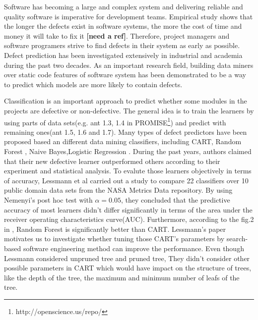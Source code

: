 \documentclass{acm_proc_article-sp}
\begin{document}
Software has becoming a large and complex system and delivering reliable and quality 
software is imperative for development teams. Empirical study shows that the longer the 
defects exist in software systems, the more the cost of time and money it will take to fix it 
\textbf{ [need a ref]}. Therefore, project managers and software programers strive to find 
defects in their system as early as possible. Defect prediction has been investigated 
extensively in industrial and academia during the past two decades. As an important research 
field, building data miners  \cite{lessmann2008benchmarking, mccabe1976complexity, 
menzies2007data, menzies2010defect, jiang2008can, menzies2011local, song2011general} 
over static code features of software system has been demonstrated to be a way to predict 
which models are more likely to contain defects.

Classification is an important approach to predict whether some modules in the projects are 
defective or non-defective. The general idea is to train the learners by using parts of data 
sets(e.g. ant 1.3, 1.4 in PROMISE\footnote{http://openscience.us/repo/}) and predict with 
remaining ones(ant 1.5, 1.6 and 1.7). Many types of defect predictors have been proposed 
based an different data mining classifiers, including CART, Random Forest 
\cite{guo2004robust},  Naive Bayes\cite{menzies2007data},Logistic Regression 
\cite{khoshgoftaar1999logistic}. During the past years, authors claimed that their new 
defective learner outperformed others according to their experiment and statistical analysis. 
To evalute those learners objectively in terms of accuracy, Lessmann et al
\cite{lessmann2008benchmarking} carried out a study to compare 22 classifiers over 10 public 
domain data sets from the NASA Metrics Data repository. By using Nemenyi's post hoc test 
with $\alpha = 0.05$, they concluded that the predictive accuracy of most learners didn't differ 
significantly in terms of the area under the receiver operating characteristics curve(AUC). 
Furthermore, according to the fig.2 in \cite{lessmann2008benchmarking}, Random Forest is 
significantly better than CART. Lessmann's paper motivates us to investigate whether tuning 
those CART's parameters by search-based software engineering method can improve the 
performance. Even though Lessmann considered unpruned tree and pruned tree, They didn't 
consider other possible parameters in CART which would have impact on the structure of 
trees, like the depth of the tree, the maximum and minimum number of leafs of the tree.
\end{document}
